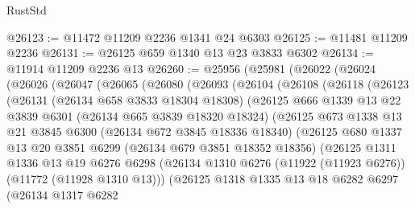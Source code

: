 \begin{lexlean}{RustStd}
\begin{coremodule}
@26123 := @11472 @11209 @2236 @1341 @24 @6303
@26125 := @11481 @11209 @2236
@26131 := @26125 @659 @1340 @13 @23 @3833 @6302
@26134 := @11914 @11209 @2236 @13
@26260 := @25956
    (@25981
      (@26022
        (@26024
          (@26026
            (@26047
              (@26065
                (@26080
                  (@26093
                    (@26104
                      (@26108
                        (@26118
                          (@26123
                            (@26131
                              (@26134 @658 @3833 @18304 @18308)
                              (@26125
                                @666
                                @1339
                                @13
                                @22
                                @3839
                                @6301
                                (@26134 @665 @3839 @18320 @18324)
                                (@26125
                                  @673
                                  @1338
                                  @13
                                  @21
                                  @3845
                                  @6300
                                  (@26134 @672 @3845 @18336 @18340)
                                  (@26125
                                    @680
                                    @1337
                                    @13
                                    @20
                                    @3851
                                    @6299
                                    (@26134 @679 @3851 @18352 @18356)
                                    (@26125
                                      @1311
                                      @1336
                                      @13
                                      @19
                                      @6276
                                      @6298
                                      (@26134
                                        @1310
                                        @6276
                                        (@11922 (@11923 @6276))
                                        (@11772 (@11928 @1310 @13)))
                                      (@26125
                                        @1318
                                        @1335
                                        @13
                                        @18
                                        @6282
                                        @6297
                                        (@26134
                                          @1317
                                          @6282

\end{coremodule}
\end{lexlean}
